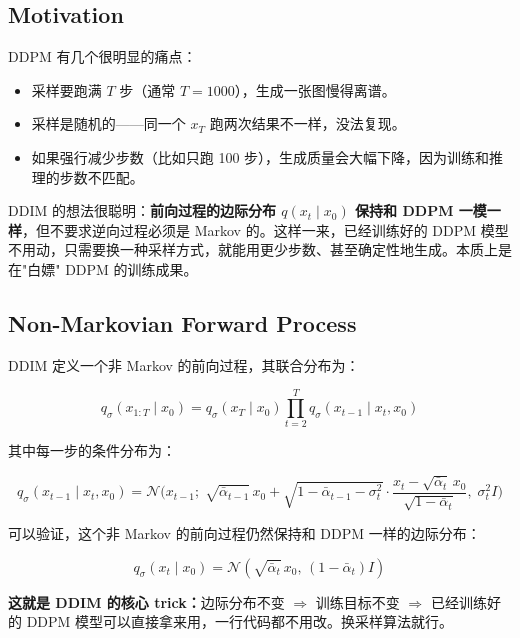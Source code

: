 \documentclass[11pt,a4paper]{article}
\theoremstyle{definition}
\newcommand{\N}{\mathcal{N}}          %
\newcommand{\alphat}{\bar{\alpha}_t}
\begin{document}
\subsection{Motivation}

DDPM 有几个很明显的痛点：

\begin{itemize}
    \item 采样要跑满 $T$ 步（通常 $T=1000$），生成一张图慢得离谱。
    \item 采样是随机的——同一个 $x_T$ 跑两次结果不一样，没法复现。
    \item 如果强行减少步数（比如只跑 100 步），生成质量会大幅下降，因为训练和推理的步数不匹配。
\end{itemize}

DDIM 的想法很聪明：\textbf{前向过程的边际分布 $q(x_t \mid x_0)$ 保持和 DDPM 一模一样}，但不要求逆向过程必须是 Markov 的。这样一来，已经训练好的 DDPM 模型不用动，只需要换一种采样方式，就能用更少步数、甚至确定性地生成。本质上是在"白嫖" DDPM 的训练成果。

\subsection{Non-Markovian Forward Process}

DDIM 定义一个非 Markov 的前向过程，其联合分布为：

\begin{equation}\label{eq:ddim_forward}
    q_\sigma(x_{1:T} \mid x_0) = q_\sigma(x_T \mid x_0) \prod_{t=2}^{T} q_\sigma(x_{t-1} \mid x_t, x_0)
\end{equation}

其中每一步的条件分布为：

\begin{equation}\label{eq:ddim_forward_step}
    q_\sigma(x_{t-1} \mid x_t, x_0) = \N\!\big(
        x_{t-1}; \;
        \sqrt{\bar{\alpha}_{t-1}}\, x_0 + \sqrt{1 - \bar{\alpha}_{t-1} - \sigma_t^2} \cdot \frac{x_t - \sqrt{\alphat}\, x_0}{\sqrt{1 - \alphat}},\;
        \sigma_t^2 I
    \big)
\end{equation}

可以验证，这个非 Markov 的前向过程仍然保持和 DDPM 一样的边际分布：

\begin{equation}\label{eq:ddim_marginal_check}
    q_\sigma(x_t \mid x_0) = \N(\sqrt{\alphat}\, x_0,\, (1 - \alphat) I)
\end{equation}

\textbf{这就是 DDIM 的核心 trick：}边际分布不变 $\Rightarrow$ 训练目标不变 $\Rightarrow$ 已经训练好的 DDPM 模型可以直接拿来用，一行代码都不用改。换采样算法就行。
\end{document}
